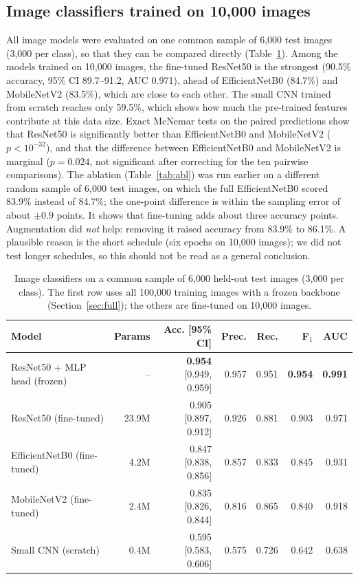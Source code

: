 \documentclass[11pt,a4paper]{article}
\begin{document}
\subsection{Image classifiers trained on 10{,}000 images}
All image models were evaluated on one common sample of 6{,}000 test images (3{,}000 per class), so that they can be compared directly (Table~\ref{tab:img}). Among the models trained on 10{,}000 images, the fine-tuned ResNet50 is the strongest (90.5\% accuracy, 95\% CI 89.7--91.2, AUC 0.971), ahead of EfficientNetB0 (84.7\%) and MobileNetV2 (83.5\%), which are close to each other. The small CNN trained from scratch reaches only 59.5\%, which shows how much the pre-trained features contribute at this data size. Exact McNemar tests on the paired predictions show that ResNet50 is significantly better than EfficientNetB0 and MobileNetV2 ($p<10^{-32}$), and that the difference between EfficientNetB0 and MobileNetV2 is marginal ($p=0.024$, not significant after correcting for the ten pairwise comparisons). The ablation (Table~\ref{tab:abl}) was run earlier on a different random sample of 6{,}000 test images, on which the full EfficientNetB0 scored 83.9\% instead of 84.7\%; the one-point difference is within the sampling error of about $\pm0.9$ points. It shows that fine-tuning adds about three accuracy points. Augmentation did \emph{not} help: removing it raised accuracy from 83.9\% to 86.1\%. A plausible reason is the short schedule (six epochs on 10{,}000 images); we did not test longer schedules, so this should not be read as a general conclusion.

\begin{table}[h]
\centering
\caption{Image classifiers on a common sample of 6{,}000 held-out test images (3{,}000 per class). The first row uses all 100{,}000 training images with a frozen backbone (Section~\ref{sec:full}); the others are fine-tuned on 10{,}000 images.}\label{tab:img}
\small
\begin{tabular}{lrrrrrr}
\toprule
Model & Params & Acc. [95\% CI] & Prec. & Rec. & F$_1$ & AUC \\
\midrule
ResNet50 + MLP head (frozen) & -- & \textbf{0.954} [0.949, 0.959] & 0.957 & 0.951 & \textbf{0.954} & \textbf{0.991} \\
ResNet50 (fine-tuned) & 23.9M & 0.905 [0.897, 0.912] & 0.926 & 0.881 & 0.903 & 0.971 \\
EfficientNetB0 (fine-tuned) & 4.2M & 0.847 [0.838, 0.856] & 0.857 & 0.833 & 0.845 & 0.931 \\
MobileNetV2 (fine-tuned) & 2.4M & 0.835 [0.826, 0.844] & 0.816 & 0.865 & 0.840 & 0.918 \\
Small CNN (scratch) & 0.4M & 0.595 [0.583, 0.606] & 0.575 & 0.726 & 0.642 & 0.638 \\
\bottomrule
\end{tabular}
\end{table}
\end{document}
